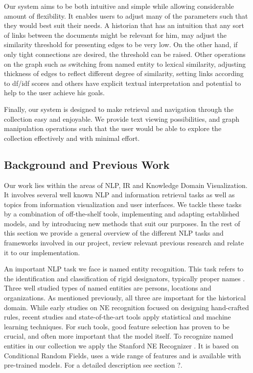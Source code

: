 Our system aims to be both intuitive and simple while allowing considerable amount of flexibility. It enables users to adjust many of the 
parameters such that they would best suit their needs. A historian that has an intuition that any sort of links between the documents might 
be relevant for him, may adjust the similarity threshold for presenting edges to be very low. On the other hand, if only tight connections 
are desired, the threshold can be raised. Other operations on the graph such as switching from named entity to lexical similarity, adjusting 
thickness of edges to reflect different degree of similarity, setting links according to df/idf scores and others have explicit textual 
interpretation and potential to help to the user achieve his goals. 

Finally, our system is designed to make retrieval and navigation through the collection easy and enjoyable. We provide text viewing 
possibilities, and graph manipulation operations such that the user would be able to explore the collection effectively and with minimal effort.


\subsection {Background and Previous Work}
\label{sec:nlp_background}


Our work lies within the areas of NLP, IR and Knowledge Domain Visualization.
It involves several well known NLP and information retrieval tasks as well as topics from information visualization and user interfaces. 
We tackle these tasks by a combination of off-the-shelf tools, implementing and adapting established models, and by introducing new methods 
that suit our purposes.  In the rest of this section we provide a general overview of the different NLP tasks and frameworks involved in our 
project, review relevant previous research and relate it to our implementation. 

An important NLP task we face is named entity recognition. This task refers to the identification and classification of rigid designators, 
typically proper names \cite{NEsurvey2009}. Three well studied types of named entities are persons, locations and organizations. 
As mentioned previously, all three are important for the historical domain. While early studies on NE recognition focused on designing 
hand-crafted rules, recent studies and state-of-the-art tools apply statistical and machine learning techniques. For such tools, 
good feature selection has proven to be crucial, and often more important that the model itself.  
To recognize named entities in our collection we apply the Stanford NE Recognizer \cite{sner}. It is based on Conditional Random Fields, 
uses a wide range of features and is available with pre-trained models.  For a detailed description see section ?.

